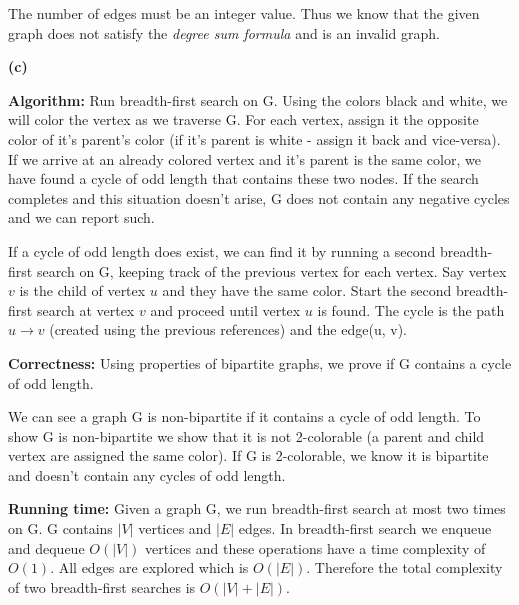 \documentclass[11pt]{article}
\renewcommand\part[1]{\vspace{.10in}\textbf{(#1)}}
\newcommand\algorith{\vspace{.10in}\textbf{Algorithm: }}
\newcommand\correctness{\vspace{.10in}\textbf{Correctness: }}
\newcommand\runtime{\vspace{.10in}\textbf{Running time: }}
\begin{document}
The number of edges must be an integer value. Thus we know that the given graph does not satisfy the \textit{degree sum formula} and is an invalid graph.

\part{c}

\algorith Run breadth-first search on G. Using the colors black and white, we will color the vertex as we traverse G. For each vertex, assign it the opposite color of it's parent's color (if it's parent is white - assign it back and vice-versa). If we arrive at an already colored vertex and it's parent is the same color, we have found a cycle of odd length that contains these two nodes. If the search completes and this situation doesn't arise, G does not contain any negative cycles and we can report such.

	If a cycle of odd length does exist, we can find it by running a second breadth-first search on G, keeping track of the previous vertex for each vertex. Say vertex $v$ is the child of vertex $u$ and they have the same color. Start the second breadth-first search at vertex $v$ and proceed until vertex $u$ is found. The cycle is the path $u \rightarrow v$ (created using the previous references) and the edge(u, v).
	
\correctness Using properties of bipartite graphs, we prove if G contains a cycle of odd length.



We can see a graph G is non-bipartite if it contains a cycle of odd length. To show G is non-bipartite we show that it is not 2-colorable (a parent and child vertex are assigned the same color). If G is 2-colorable, we know it is bipartite and doesn't contain any cycles of odd length.

\runtime Given a graph G, we run breadth-first search at most two times on G. G contains $|V|$ vertices and $|E|$ edges. In breadth-first search we enqueue and dequeue $O(|V|)$ vertices and these operations have a time complexity of $O(1)$. All edges are explored which is $O(|E|)$. Therefore the total complexity of two breadth-first searches is $O(|V| + |E|)$.

\end{document}
